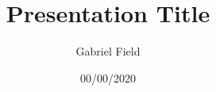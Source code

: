 \documentclass{beamer}
\title{Presentation Title}
\author{Gabriel Field}
\date{00/00/2020}
\begin{document}
\frame{\titlepage}


\end{document}
